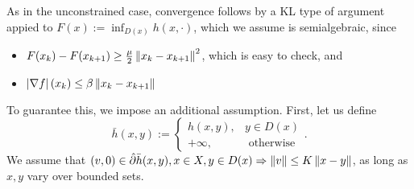 As in the unconstrained case, convergence follows by a KL type of argument
appied to $F(x) := \inf_{D(x)} h(x, \cdot)$, which we assume is semialgebraic,
since
\begin{itemize}
	\item $F(x_k) - F(x_{k+1}) \geq \frac{\mu}{2} \left \| x_k - x_{k+1} \right \|^2$,
		which is easy to check, and
	\item $\left| \nabla f \right|(x_k) \leq \beta \left \| x_k - x_{k+1} \right \|$
\end{itemize}

To guarantee this, we impose an additional assumption. First, let us define
\[
	\bar{h}(x, y) := \begin{cases}
		h(x, y), & y \in D(x) \\
		+\infty, & \text{ otherwise}
	\end{cases}.
\]
We assume that $(v, 0) \in \hat{\partial} \bar{h}(x, y), x \in X, y \in D(x)
\Rightarrow \left \| v \right \| \leq K \left \| x - y \right \|$, as long as $x, y$ vary over bounded
sets.
